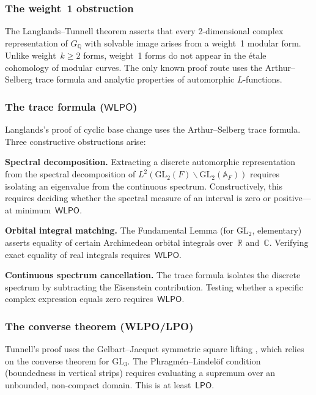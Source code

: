 \documentclass[11pt]{article}
\theoremstyle{plain}
\theoremstyle{definition}
\theoremstyle{remark}
\newcommand{\Q}{\mathbb{Q}}
\newcommand{\R}{\mathbb{R}}
\newcommand{\C}{\mathbb{C}}
\newcommand{\A}{\mathbb{A}}
\newcommand{\GL}{\mathrm{GL}}
\newcommand{\LPO}{\mathsf{LPO}}
\newcommand{\WLPO}{\mathsf{WLPO}}
\begin{document}
\subsubsection{The weight~1 obstruction}

The Langlands--Tunnell theorem asserts that every 2-dimensional
complex representation of $G_\Q$ with solvable image arises from a
weight~1 modular form.  Unlike weight~$k \ge 2$ forms, weight~1
forms do not appear in the \'etale cohomology of modular curves.
The only known proof route uses the Arthur--Selberg trace
formula and analytic properties of automorphic $L$-functions.

\subsubsection{The trace formula (\texorpdfstring{$\WLPO$}{WLPO})}

Langlands's proof of cyclic base change \cite{Langlands1980}
uses the Arthur--Selberg trace formula.
Three constructive obstructions arise:

\textbf{Spectral decomposition.}  Extracting a discrete
automorphic representation from the spectral decomposition
of $L^2(\GL_2(F) \backslash \GL_2(\A_F))$ requires isolating an
eigenvalue from the continuous spectrum.
Constructively, this requires deciding whether the spectral
measure of an interval is zero or positive---at minimum~$\WLPO$.

\textbf{Orbital integral matching.}  The Fundamental Lemma
(for $\GL_2$, elementary) asserts equality of certain
Archimedean orbital integrals over~$\R$ and~$\C$.  Verifying
exact equality of real integrals requires~$\WLPO$.

\textbf{Continuous spectrum cancellation.}  The trace formula
isolates the discrete spectrum by subtracting the Eisenstein
contribution.  Testing whether a specific complex expression
equals zero requires~$\WLPO$.

\subsubsection{The converse theorem (WLPO/LPO)}

Tunnell's proof \cite{Tunnell1981} uses the Gelbart--Jacquet
symmetric square lifting \cite{GelbartJacquet1978}, which relies on
the converse theorem for $\GL_3$.  The
Phragm\'en--Lindel\"of condition (boundedness in vertical
strips) requires evaluating a supremum over an unbounded,
non-compact domain.  This is at least~$\LPO$.
\end{document}
